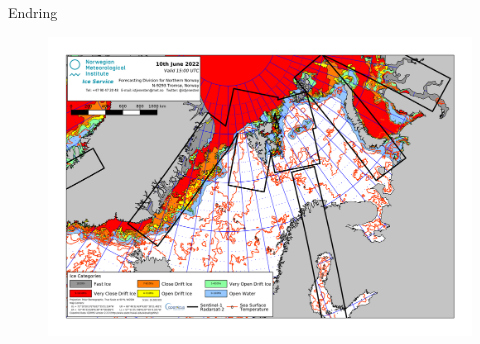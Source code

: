 \documentclass[../main/thesis.tex]{subfiles}
\begin{document}
Endring


\begin{figure}
    \includegraphics[width=\textwidth]{../figures/general_latest.png}
\end{figure}


\biblio
\end{document}
